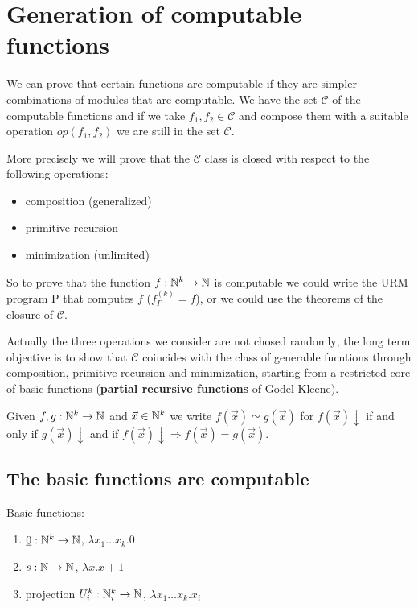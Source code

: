 \chapter {Generation of computable functions}

We can prove that certain functions are computable if they are simpler combinations of modules that are computable. We have the set $ \mathcal{C} $ of the computable functions and if we take $ f_1, f_2 \in \mathcal{C} $ and compose them with a suitable operation $ op(f_1, f_2) $ we are still in the set $ \mathcal{C} $.

More precisely we will prove that the $\mathcal{C}$ class is closed with respect to the following operations:
\begin{itemize}
\item composition (generalized)
\item primitive recursion
\item minimization (unlimited)
\end{itemize}

So to prove that the function $f:\mathbb{N}^k\rightarrow \mathbb{N}$ is computable we could write the URM program P that computes $f$ ($f_P^{(k)} = f$), or we could use the theorems of the closure of $\mathcal{C}$.

Actually the three operations we consider are not chosed randomly; the long term objective is to show that $\mathcal{C}$ coincides with the class of generable fucntions through composition, primitive recursion and minimization, starting from a restricted core of basic functions (\textbf{partial recursive functions} of Godel-Kleene).

\begin{notation}
  Given $f,g:\mathbb{N}^k\rightarrow\mathbb{N}$ and
  $\vec{x}\in\mathbb{N}^k$ we write $f(\vec{x}) \simeq g(\vec{x}) $ for
  $f(\vec{x})\downarrow$ if and only if $g(\vec{x})\downarrow$ and if
  $f(\vec{x})\downarrow \Rightarrow f(\vec{x}) = g(\vec{x})$.
\end{notation}

\section {The basic functions are computable}
Basic functions:
\begin{enumerate}
\item $ \underline{0}: \mathbb{N}^k \rightarrow \mathbb{N} $, $\lambda x_1\dots x_k . 0$
\item $ s: \mathbb{N} \rightarrow \mathbb{N} $, $\lambda x . x+1$
\item projection $ U_i^k: \mathbb{N}_i^k \rightarrow \mathbb{N} $,  $\lambda x_1\dots x_k . x_i$
\end{enumerate}


